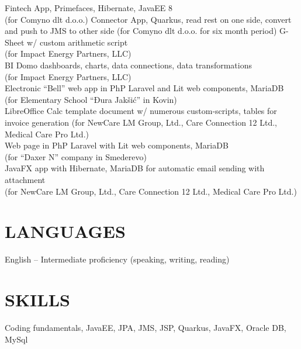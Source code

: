 \documentclass{article}
\begin{document}
Fintech App, Primefaces, Hibernate, JavaEE 8\\
(for Comyno dlt d.o.o.)
Connector App, Quarkus, read rest on one side, convert and push to JMS to other side
(for Comyno dlt d.o.o. for six month period)
G-Sheet w/ custom arithmetic script\\
(for Impact Energy Partners, LLC)\\
BI Domo dashboards, charts, data connections, data transformations\\
(for Impact Energy Partners, LLC)\\
Electronic ``Bell'' web app in PhP Laravel and Lit web components,
MariaDB\\
(for Elementary School ``Đura Jakšić'' in Kovin)\\
LibreOffice Calc template document w/ numerous custom-scripts, tables
for invoice generation (for NewCare LM Group, Ltd., Care Connection 12
Ltd., Medical Care Pro Ltd.)\\
Web page in PhP Laravel with Lit web components, MariaDB\\
(for ``Daxer N'' company in Smederevo)\\
JavaFX app with Hibernate, MariaDB for automatic email sending with attachment\\
(for NewCare LM Group, Ltd., Care Connection 12 Ltd., Medical Care Pro
Ltd.)

\section{LANGUAGES}

English -- Intermediate proficiency (speaking, writing, reading)

\section{SKILLS}

Coding fundamentals, JavaEE, JPA, JMS, JSP,  Quarkus, JavaFX, Oracle DB, MySql
\end{document}
